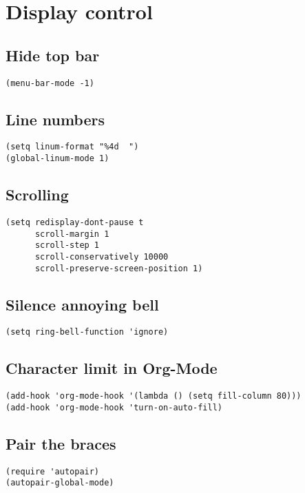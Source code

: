 \documentclass[11pt]{article}
\begin{document}
\section{Display control}
\label{sec:org65e87c4}
\subsection{Hide top bar}
\label{sec:orgf2d779c}
\begin{verbatim}
(menu-bar-mode -1)
\end{verbatim}
\subsection{Line numbers}
\label{sec:orgac5f186}
\begin{verbatim}
(setq linum-format "%4d  ")
(global-linum-mode 1)
\end{verbatim}
\subsection{Scrolling}
\label{sec:org5b9b712}
\begin{verbatim}
(setq redisplay-dont-pause t
      scroll-margin 1
      scroll-step 1
      scroll-conservatively 10000
      scroll-preserve-screen-position 1)
\end{verbatim}
\subsection{Silence annoying bell}
\label{sec:org6733028}
\begin{verbatim}
(setq ring-bell-function 'ignore)
\end{verbatim}
\subsection{Character limit in Org-Mode}
\label{sec:orgf35b481}
\begin{verbatim}
(add-hook 'org-mode-hook '(lambda () (setq fill-column 80)))
(add-hook 'org-mode-hook 'turn-on-auto-fill)
\end{verbatim}
\subsection{Pair the braces}
\label{sec:org9e91ade}
\begin{verbatim}
(require 'autopair)
(autopair-global-mode)
\end{verbatim}
\end{document}
